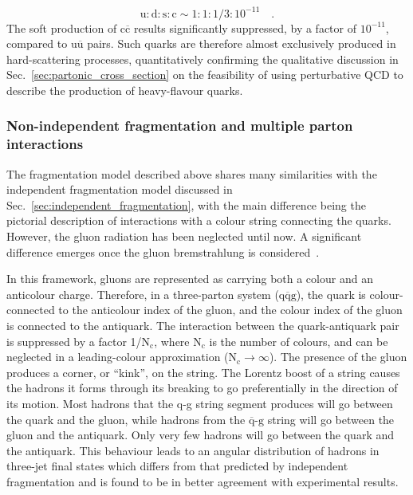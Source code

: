 \begin{equation*}
    \mathrm{u : d : s : c} \sim 1 : 1 : 1/3 : 10^{-11}\quad .
\end{equation*}
The soft production of $\mathrm{c\overline{c}}$ results significantly suppressed, by a factor of $10^{-11}$, compared to $\mathrm{u\overline{u}}$ pairs. Such quarks are therefore almost exclusively produced in hard-scattering processes, quantitatively confirming the qualitative discussion in Sec.~\ref{sec:partonic_cross_section} on the feasibility of using perturbative QCD to describe the production of heavy-flavour quarks.

\subsubsection{Non-independent fragmentation and multiple parton interactions}
The fragmentation model described above shares many similarities with the independent fragmentation model discussed in Sec.~\ref{sec:independent_fragmentation}, with the main difference being the pictorial description of interactions with a colour string connecting the quarks. However, the gluon radiation has been neglected until now. A significant difference emerges once the gluon bremstrahlung is considered~\cite{Sjostrand:1984ic}. 

In this framework, gluons are represented as carrying both a colour and an anticolour charge. Therefore, in a three-parton system ($\mathrm{q\overline{q}g}$), the quark is colour-connected to the anticolour index of the gluon, and the colour index of the gluon is connected to the antiquark. The interaction between the quark-antiquark pair is suppressed by a factor 1/$\mathrm{N_c}$, where $\mathrm{N_c}$ is the number of colours, and can be neglected in a leading-colour approximation ($\mathrm{N_c} \rightarrow\infty$). The presence of the gluon produces a corner, or “kink”, on the string. The Lorentz boost of a string causes the hadrons it forms through its breaking to go preferentially in the direction of its motion. Most hadrons that the q-g string segment produces will go between the quark and the gluon, while hadrons from the $\mathrm{\overline{q}\text{-}g}$ string will go between the gluon and the antiquark. Only very few hadrons will go between the quark and the antiquark. This behaviour leads to an angular distribution of hadrons in \ee three-jet final states which differs from that predicted by independent fragmentation and is found to be in better agreement with experimental results. 


